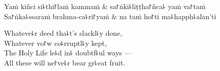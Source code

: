 \begin{twochants}
  Yaṁ kiñci si꜕thi꜓laṁ kammaṁ & sa꜓ṅki꜕liṭṭha꜓ñca꜕ yaṁ va꜓taṁ \\
  Sa꜓ṅka꜕ssaraṁ brahma-ca꜕ri꜓yaṁ & na taṁ ho꜓ti ma꜕happh꜕alan'ti \\
\end{twochants}

\begin{english}
  Whateve꜕r deed tha꜕t's slackl꜕y done,\\
  Whatever vo꜓w co꜕rruptl꜕y kept,\\
  The Holy Life le꜕d in꜕ doubtf꜕ul ways ---\\
  All these will ne꜓ve꜕r bear gr꜕eat fruit.
\end{english}


